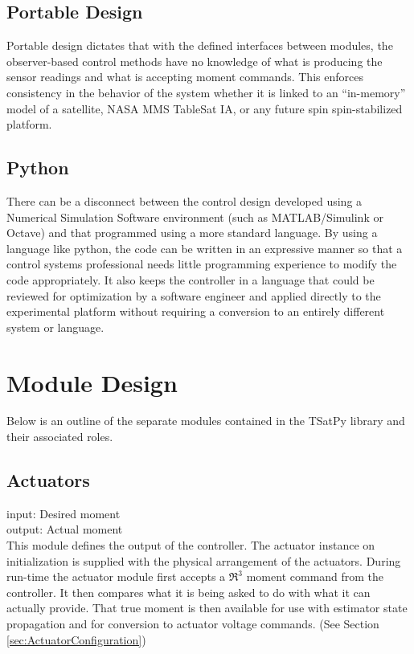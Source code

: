 \subsection{Portable Design}

Portable design dictates that with the defined interfaces between modules, the observer-based control methods have no knowledge of what is producing the sensor readings and what is accepting moment commands. This enforces consistency in the behavior of the system whether it is linked to an ``in-memory'' model of a satellite, NASA MMS TableSat IA, or any future spin spin-stabilized platform.

\subsection{Python}

There can be a disconnect between the control design developed using a Numerical Simulation Software environment (such as MATLAB/Simulink or Octave) and that programmed using a more standard language. By using a language like python, the code can be written in an expressive manner so that a control systems professional needs little programming experience to modify the code appropriately. It also keeps the controller in a language that could be reviewed for optimization by a software engineer and applied directly to the experimental platform without requiring a conversion to an entirely different system or language.


\section{Module Design}
\label{sec:Module Design}

Below is an outline of the separate modules contained in the TSatPy library and their associated roles.

\subsection{Actuators}
\label{subsec:actuators}

input: Desired moment\\
output: Actual moment\\

This module defines the output of the controller. The actuator instance on initialization is supplied with the physical arrangement of the actuators. During run-time the actuator module first accepts a $\Re^3$ moment command from the controller.  It then compares what it is being asked to do with what it can actually provide.  That true moment is then available for use with estimator state propagation and for conversion to actuator voltage commands. (See Section \ref{sec:ActuatorConfiguration})

